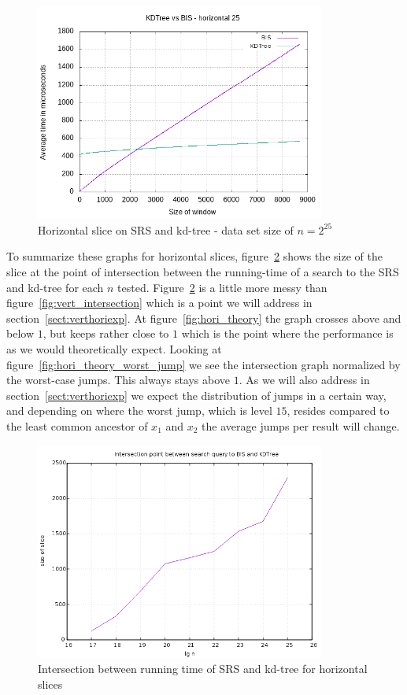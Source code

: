 \begin{figure}[h]
    \centering
    \includegraphics[width = 0.85\textwidth]{pictures/analysis/hori_25.png}
    \caption{Horizontal slice on SRS and kd-tree - data set size of $n=2^{25}$}\label{fig:hori_25}
\end{figure}


To summarize these graphs for horizontal slices, figure~\ref{fig:hori_intersection} shows the size of the slice at the point of intersection between the running-time of a search to the SRS and kd-tree for each $n$ tested. Figure~\ref{fig:hori_intersection} is a little more messy than figure~\ref{fig:vert_intersection} which is a point we will address in section~\ref{sect:verthoriexp}. At figure~\ref{fig:hori_theory} the graph crosses above and below $1$, but keeps rather close to $1$ which is the point where the performance is as we would theoretically expect. Looking at figure~\ref{fig:hori_theory_worst_jump} we see the intersection graph normalized by the worst-case jumps. This always stays above $1$. As we will also address in section~\ref{sect:verthoriexp} we expect the distribution of jumps in a certain way, and depending on where the worst jump, which is level $15$, resides compared to the least common ancestor of $x_1$ and $x_2$ the average jumps per result will change.

\begin{figure}[h]
    \centering
    \includegraphics[width = 0.85\textwidth]{pictures/analysis/hori.png}
    \caption{Intersection between running time of SRS and kd-tree for horizontal slices}\label{fig:hori_intersection}
\end{figure}


